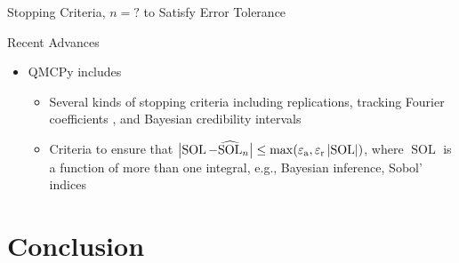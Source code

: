 \documentclass[11pt,compress,xcolor={usenames,dvipsnames},aspectratio=169]{beamer}
\DeclareMathOperator{\sol}{SOL}
\begin{document}
\begin{frame}{Stopping Criteria, $n = ?$ to Satisfy Error Tolerance}
	
	\begin{multicols}{2}
		{\Large \alert{Recent Advances}}
		\begin{itemize}
			\item QMCPy includes 
			\begin{itemize}
				\item Several kinds of stopping criteria including replications, tracking Fourier coefficients \cite{HicJim16a,JimHic16a}, and Bayesian credibility intervals \cite{RatHic19a}
				\item Criteria to ensure that $\bigl \lvert \sol - \widehat{\sol}_n \bigr \rvert \le   \max(\varepsilon_{\text{a}}, \varepsilon_{\text{r}} \abs{\sol})$, where
				$\sol$ is a function of more than one integral, e.g., Bayesian inference, Sobol' indices
			\end{itemize}
						
		\end{itemize}
		
		\columnbreak
		
		
	\end{multicols}
\end{frame}

\section{Conclusion}
\end{document}
